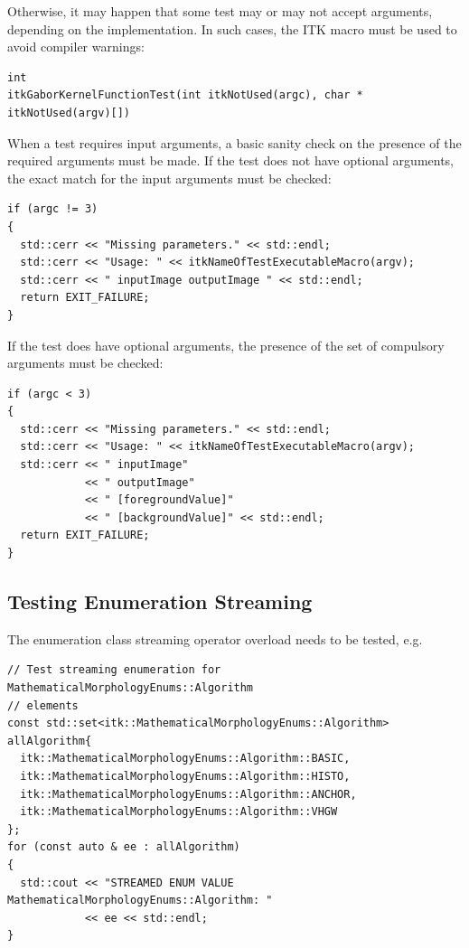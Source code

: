 Otherwise, it may happen that some test may or may not accept arguments,
depending on the implementation. In such cases, the  ITK macro
must be used to avoid compiler warnings:

\small
\begin{verbatim}
int
itkGaborKernelFunctionTest(int itkNotUsed(argc), char * itkNotUsed(argv)[])
\end{verbatim}
\normalsize

When a test requires input arguments, a basic sanity check on the presence of
the required arguments must be made. If the test does not have optional
arguments, the exact match for the input arguments must be checked:

\small
\begin{verbatim}
if (argc != 3)
{
  std::cerr << "Missing parameters." << std::endl;
  std::cerr << "Usage: " << itkNameOfTestExecutableMacro(argv);
  std::cerr << " inputImage outputImage " << std::endl;
  return EXIT_FAILURE;
}
\end{verbatim}
\normalsize

If the test does have optional arguments, the presence of the set of compulsory
arguments must be checked:

\small
\begin{verbatim}
if (argc < 3)
{
  std::cerr << "Missing parameters." << std::endl;
  std::cerr << "Usage: " << itkNameOfTestExecutableMacro(argv);
  std::cerr << " inputImage"
            << " outputImage"
            << " [foregroundValue]"
            << " [backgroundValue]" << std::endl;
  return EXIT_FAILURE;
}
\end{verbatim}
\normalsize


\subsection{Testing Enumeration Streaming}%
\label{subsec:TestEnumStreaming}

The enumeration class streaming operator overload needs to be tested, e.g.
\small
\begin{verbatim}
// Test streaming enumeration for MathematicalMorphologyEnums::Algorithm
// elements
const std::set<itk::MathematicalMorphologyEnums::Algorithm> allAlgorithm{
  itk::MathematicalMorphologyEnums::Algorithm::BASIC,
  itk::MathematicalMorphologyEnums::Algorithm::HISTO,
  itk::MathematicalMorphologyEnums::Algorithm::ANCHOR,
  itk::MathematicalMorphologyEnums::Algorithm::VHGW
};
for (const auto & ee : allAlgorithm)
{
  std::cout << "STREAMED ENUM VALUE MathematicalMorphologyEnums::Algorithm: "
            << ee << std::endl;
}
\end{verbatim}
\normalsize



